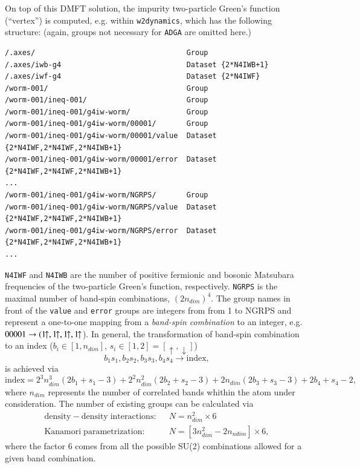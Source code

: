 \documentclass[a4paper,11pt]{article}
\numberwithin{equation}{section} %
\begin{document}
On top of this DMFT solution, the impurity two-particle Green's function (``vertex'') is computed, e.g. within \verb|w2dynamics|,
which has the following structure: (again, groups not necessary for \verb+ADGA+
are omitted here.)
\begin{lstlisting}[caption=HDF5-structure of the worm-sampled vertex, frame=single, basicstyle=\small, label={lst:dmft2}]
/.axes/                                   Group
/.axes/iwb-g4                             Dataset {2*N4IWB+1}
/.axes/iwf-g4                             Dataset {2*N4IWF}
/worm-001/                                Group
/worm-001/ineq-001/                       Group
/worm-001/ineq-001/g4iw-worm/             Group
/worm-001/ineq-001/g4iw-worm/00001/       Group
/worm-001/ineq-001/g4iw-worm/00001/value  Dataset {2*N4IWF,2*N4IWF,2*N4IWB+1}
/worm-001/ineq-001/g4iw-worm/00001/error  Dataset {2*N4IWF,2*N4IWF,2*N4IWB+1}
...
/worm-001/ineq-001/g4iw-worm/NGRPS/       Group
/worm-001/ineq-001/g4iw-worm/NGRPS/value  Dataset {2*N4IWF,2*N4IWF,2*N4IWB+1}
/worm-001/ineq-001/g4iw-worm/NGRPS/error  Dataset {2*N4IWF,2*N4IWF,2*N4IWB+1}
...
\end{lstlisting}
\verb|N4IWF| and \verb|N4IWB| are the number of positive fermionic and bosonic Matsubara frequencies of the
two-particle Green's function, respectively. \verb|NGRPS| is the maximal number of band-spin combinations, $(2n_{dim})^4$.
The group names in front of the \verb|value| and \verb|error| groups are integers
from from 1 to NGRPS and represent a one-to-one mapping from a \emph{band-spin combination}
to an integer, e.g.~$00001 \rightarrow (1\hspace{-4pt}\uparrow, 1\hspace{-4pt}\uparrow, 1\hspace{-4pt}\uparrow, 1\hspace{-4pt}\uparrow$).
In general, the transformation of band-spin combination to an index ($b_i \in [1,n_{dim}]$, $s_i \in [1,2] = [\uparrow, \downarrow]$)
\begin{equation*}
b_1 s_1,b_2 s_2, b_3 s_3, b_4s_4 \rightarrow \mathrm{index},
\end{equation*}
is achieved via
\begin{equation*}
\mathrm{index} = 2^3 n_{dim}^3(2 b_1+s_1-3) + 2^2 n_{dim}^2(2 b_2+s_2-3) + 2 n_{dim}(2 b_3+s_3-3) + 2 b_4 + s_4 - 2,
\end{equation*}
where $n_{dim}$ represents the number of correlated bands whithin the atom under consideration.
The number of existing groups can be calculated via
\begin{equation*}
\begin{aligned}
\mathrm{density-density\;interactions: }&\;\; N = n_{dim}^2 \times 6 \\
\mathrm{Kanamori\;parametrization: }&\;\; N = \left[3n_{dim}^2 - 2n_{ndim}\right] \times 6,
\end{aligned}
\end{equation*}
where the factor $6$ comes from all the possible SU(2) combinations allowed for a given band combination.
\end{document}
